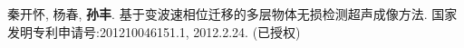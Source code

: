 \begin{resume}
\begin{publications}
  \end{publications}

\newpage

  \begin{achievements}
    \item 秦开怀, 杨春, {\bf 孙丰}. 基于变波速相位迁移的多层物体无损检测超声成像方法. 国家发明专利申请号:201210046151.1, 2012.2.24. (已授权)
  \end{achievements}

\end{resume}
